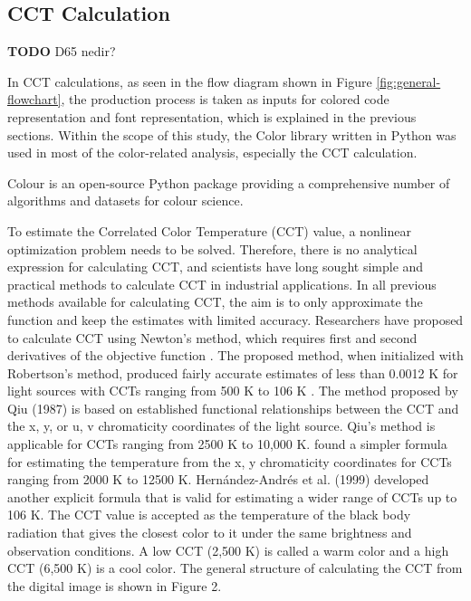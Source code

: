 \documentclass{article}
\begin{document}
\subsection{CCT Calculation}

\textbf{TODO} D65 nedir?

In CCT calculations, as seen in the flow diagram shown in Figure  \ref{fig:general-flowchart}, the production process is taken as inputs for colored code representation and font representation, which is explained in the previous sections. Within the scope of this study, the Color library \cite{colour2022package} written in Python was used in most of the color-related analysis, especially the CCT calculation.

Colour is an open-source Python package providing a comprehensive number of algorithms and datasets for colour science.

To estimate the Correlated Color Temperature (CCT) value, a nonlinear optimization problem needs to be solved. Therefore, there is no analytical expression for calculating CCT, and scientists have long sought simple and practical methods to calculate CCT in industrial applications. In all previous methods available for calculating CCT, the aim is to only approximate the function and keep the estimates with limited accuracy. Researchers have proposed to calculate CCT using Newton's method, which requires first and second derivatives of the objective function \cite{li2016accurate}. The proposed method, when initialized with Robertson's method, produced fairly accurate estimates of less than 0.0012 K for light sources with CCTs ranging from 500 K to 106 K \cite{robertson1968computation}. The method proposed by Qiu (1987) is based on established functional relationships between the CCT and the x, y, or u, v chromaticity coordinates of the light source. Qiu's method is applicable for CCTs ranging from 2500 K to 10,000 K. \cite{mccamy1992correlated} found a simpler formula for estimating the temperature from the x, y chromaticity coordinates for CCTs ranging from 2000 K to 12500 K. Hernández-Andrés et al. (1999) \cite{hernandez1999calculating} developed another explicit formula that is valid for estimating a wider range of CCTs up to 106 K. The CCT value is accepted as the temperature of the black body radiation that gives the closest color to it under the same brightness and observation conditions. A low CCT (2,500 K) is called a warm color and a high CCT (6,500 K) is a cool color. The general structure of calculating the CCT from the digital image is shown in Figure 2.
\end{document}
